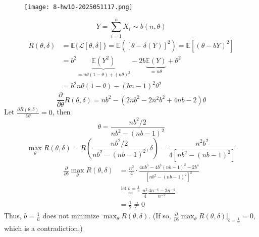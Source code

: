 \begin{exercise}
\begin{figure}[H]
\centering
\texttt{[image: 8-hw10-2025051117.png]}
\label{}
\end{figure}
\end{exercise}
\[
Y=\sum_{i=1}^{n} X_i\sim b(n,\theta)
\]
\[
\begin{aligned}
R(\theta,\delta) & =\mathbb{E}\{ \mathcal{L}[\theta,\delta] \}=\mathbb{E}([\theta-\delta(Y)]^2)=\mathbb{E}[(\theta-bY)^2]  \\
 & =b^2\underbrace{ \mathbb{E}(Y^2) }_{ =n\theta(1-\theta)+(n\theta)^2 }-2b\underbrace{ \mathbb{E}(Y) }_{ =n\theta }+\theta^{2} \\
 & =b^2n\theta(1-\theta )-(bn-1)^2\theta^{2}
\end{aligned}
\]
\[
\frac{ \partial   }{ \partial \theta } R(\theta,\delta)=nb^2-(2nb^2-2n^2b^2+4nb-2)\theta
\]
Let $\frac{ \partial R(\theta,\delta) }{ \partial \theta }=0$, then
\[
\theta=\frac{nb^2/2 }{nb^2-(nb-1)^2}
\]
\[
\max_{\theta}R(\theta,\delta)=R\left( \frac{nb^2/2 }{nb^2-(nb-1)^2},\delta \right)=\frac{n^2b^2}{4[nb^2-(nb-1)^2]}
\]
\[
\begin{aligned}
\frac{ \partial   }{ \partial b }\max_{\theta}R(\theta,\delta) & =\frac{n^2}{4}\cdot\frac{4nb^{5}-4b^3(nb-1)^2-2b^{4}}{[nb^2-(nb-1)^2]^2}  \\
 & \overset{ \text{let }b=\frac{1}{n} }{ = }\frac{n^2}{4}\frac{4n^{-4}-2n^{-4}}{n^{-2}} \\
 & =\frac{1}{2}\neq0 
\end{aligned}
\]
Thus, $b=\frac{1}{n}$ does not minimize $\max_{\theta}R(\theta,\delta)$. (If so, $\frac{\partial}{\partial b}\left.\max_{\theta}R(\theta,\delta)\right|_{b=\frac{1}{n}}=0$, which is a contradiction.)

